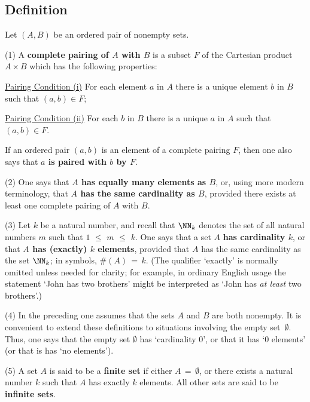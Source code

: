 {        \subsection{\small{\bf Definition}}
            \label{DefA12.70}

        Let $(A,B)$ be an ordered pair of nonempty sets.

        (1) A {\bf complete pairing of $A$ with $B$} is a subset $F$ of the Cartesian product $A{\times}B$ which has the following properties:

        \h \underline{Pairing Condition (i)} For each element $a$ in $A$ there is a unique element $b$ in $B$ such that $(a,b){\in}F$;

        \h \underline{Pairing Condition (ii)} For each $b$ in $B$ there is a unique $a$ in $A$ such that $(a,b){\in}F$.

\noindent If an ordered pair $(a,b)$ is an element of a complete pairing $F$, then one also says that {\bf $a$ is paired with $b$ by $F$}.

\V

        (2) One says that {\bf $A$ has equally many elements as $B$}, or, using more modern terminology,
    that {\bf $A$ has the same cardinality as $B$},
    provided there exists at least one complete pairing of $A$ with $B$.

\V

        (3) Let $k$ be a natural number, and recall that ${\NN}_{k}$ denotes the set of all natural numbers $m$ such that $1\,\,{\leq}\,\,m\,\,{\leq}\,\,k$.
    One says that a set $A$ {\bf has cardinality $k$}, or that {\bf $A$ has (exactly) $k$ elements},
    provided that $A$ has the same cardinality as the set ${\NN}_{k}$; in symbols, $\# (A)\,=\,k$.
    (The qualifier `exactly' is normally omitted unless needed for clarity; for example,
    in ordinary English usage the statement `John has two brothers' might be interpreted as `John has {\em at least} two brothers'.)


        (4) In the preceding one assumes that the sets $A$ and $B$ are both nonempty.
    It is convenient to extend these definitions to situations involving the empty set~${\emptyset}$.
    Thus, one says that the empty set ${\emptyset}$ has `cardinality $0$', or that it has `$0$ elements' (or that is has `no elements').

\V

        (5) A set $A$ is said to be a {\bf finite set} if either $A \,=\, {\emptyset}$, or there exists a natural number $k$ such that $A$ has exactly $k$ elements.
    All other sets are said to be {\bf infinite sets}.

}
